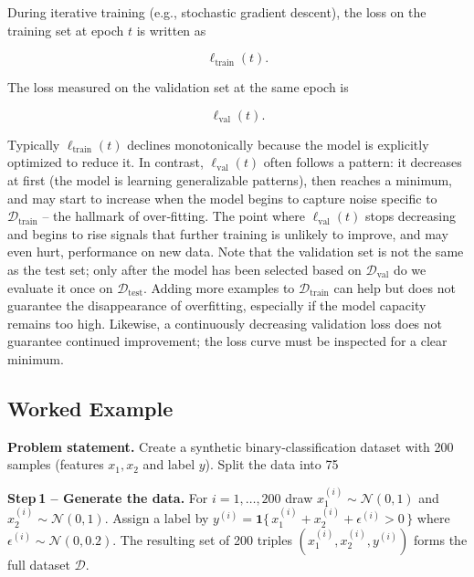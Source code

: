\documentclass[12pt, a4paper]{article}
\begin{document}
During iterative training (e.g., stochastic gradient descent), the loss on the training set at epoch \(t\) is written as  

\[
\ell_{\text{train}}(t).
\]

The loss measured on the validation set at the same epoch is  

\[
\ell_{\text{val}}(t).
\]

Typically \(\ell_{\text{train}}(t)\) declines monotonically because the model is explicitly optimized to reduce it. In contrast, \(\ell_{\text{val}}(t)\) often follows a pattern: it decreases at first (the model is learning generalizable patterns), then reaches a minimum, and may start to increase when the model begins to capture noise specific to \(\mathcal{D}_{\text{train}}\) – the hallmark of over‑fitting. The point where \(\ell_{\text{val}}(t)\) stops decreasing and begins to rise signals that further training is unlikely to improve, and may even hurt, performance on new data. Note that the validation set is not the same as the test set; only after the model has been selected based on \(\mathcal{D}_{\text{val}}\) do we evaluate it once on \(\mathcal{D}_{\text{test}}\). Adding more examples to \(\mathcal{D}_{\text{train}}\) can help but does not guarantee the disappearance of overfitting, especially if the model capacity remains too high. Likewise, a continuously decreasing validation loss does not guarantee continued improvement; the loss curve must be inspected for a clear minimum.

\subsection{Worked Example}
\textbf{Problem statement.}  
Create a synthetic binary‑classification dataset with 200 samples (features \(x_1, x_2\) and label \(y\)). Split the data into 75 %

\textbf{Step 1 – Generate the data.}  
For \(i=1,\dots,200\) draw \(x_{1}^{(i)}\sim\mathcal{N}(0,1)\) and \(x_{2}^{(i)}\sim\mathcal{N}(0,1)\).  
Assign a label by \(y^{(i)} = \mathbf{1}\{\,x_{1}^{(i)}+x_{2}^{(i)}+ \epsilon^{(i)} > 0\,\}\) where \(\epsilon^{(i)}\sim\mathcal{N}(0,0.2)\).  
The resulting set of 200 triples \((x_{1}^{(i)},x_{2}^{(i)},y^{(i)})\) forms the full dataset \(\mathcal{D}\).
\end{document}
